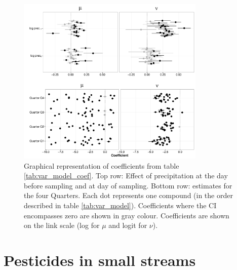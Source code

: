\documentclass[pdftex,a4paper]{scrreprt}
\begin{document}
\begin{figure}[ht]
	\centering
	\includegraphics[width = 0.8\textwidth]{coefs}
	\caption[Graphical representation of coefficients from table \ref{tab:var_model_coef}.]{Graphical representation of coefficients from table \ref{tab:var_model_coef}. Top row: Effect of precipitation at the day before sampling and at day of sampling. Bottom row: estimates for the four Quarters. Each dot represents one compound (in the order described in table \ref{tab:var_model}). Coefficients where the CI encompasses zero are shown in gray colour. Coefficients are shown on the link scale (log for $\mu$ and logit for $\nu$).}
	\label{fig:coefs}
\end{figure}



\chapter{Pesticides in small streams}

\end{document}
